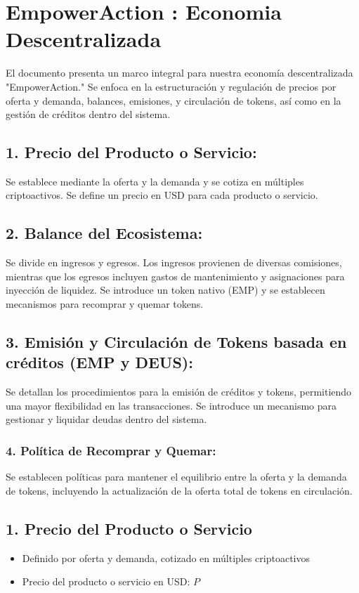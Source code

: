 \documentclass{article}
\begin{document}
\section*{EmpowerAction : Economia Descentralizada}

El documento presenta un marco integral para nuestra economía descentralizada "EmpowerAction." 
Se enfoca en la estructuración y regulación de precios por oferta y demanda, balances, emisiones, y circulación de tokens, así como en la gestión de créditos dentro del sistema.

\subsection*{1. Precio del Producto o Servicio:}
 Se establece mediante la oferta y la demanda y se cotiza en múltiples criptoactivos. Se define un precio en USD para cada producto o servicio.

\subsection*{2. Balance del Ecosistema:} Se divide en ingresos y egresos. Los ingresos provienen de diversas comisiones, mientras que los egresos incluyen gastos de mantenimiento y asignaciones para inyección de liquidez. Se introduce un token nativo (EMP) y se establecen mecanismos para recomprar y quemar tokens.

\subsection*{3. Emisión y Circulación de Tokens basada en créditos (EMP y DEUS):} Se detallan los procedimientos para la emisión de créditos y tokens, permitiendo una mayor flexibilidad en las transacciones. Se introduce un mecanismo para gestionar y liquidar deudas dentro del sistema.

\subsubsection*{4. Política de Recomprar y Quemar:} Se establecen políticas para mantener el equilibrio entre la oferta y la demanda de tokens, incluyendo la actualización de la oferta total de tokens en circulación.


\subsection*{1. Precio del Producto o Servicio}
\begin{itemize}
    \item Definido por oferta y demanda, cotizado en múltiples criptoactivos
    \item Precio del producto o servicio en USD: \( P \)
\end{itemize}
\end{document}
